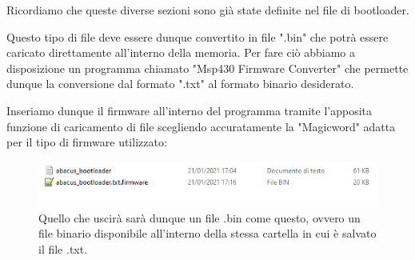 \documentclass[LaM,binding=0.6cm,oneside]{../sapthesis}
\begin{document}
Ricordiamo che queste diverse sezioni sono già state definite nel file di bootloader.

Questo tipo di file deve essere dunque convertito in file ".bin" che potrà essere caricato direttamente all'interno della memoria.
\vspace{0.5cm}
Per fare ciò abbiamo a disposizione un programma chiamato "Msp430 Firmware Converter" che permette dunque la conversione dal formato ".txt" al formato binario desiderato.

Inseriamo dunque il firmware all'interno del programma tramite l'apposita funzione di caricamento di file scegliendo accuratamente la "Magicword" adatta per il tipo di firmware utilizzato:

\begin{figure}[htbp]
\centerline{\includegraphics[scale=0.76]{examples/FileTiConverter.PNG}}
\caption{Quello che uscirà sarà dunque un file .bin come questo, ovvero un file binario disponibile all'interno della stessa cartella in cui è salvato il file .txt.}
\label{fig}
\end{figure}
\newline
\end{document}
